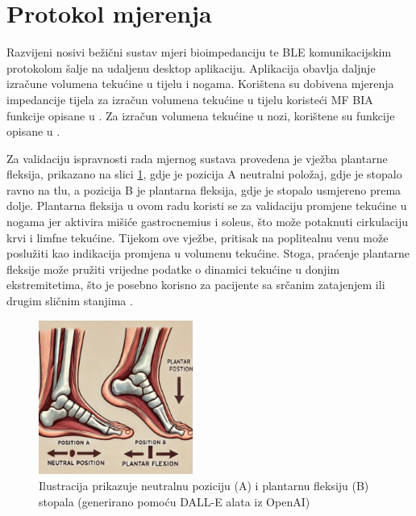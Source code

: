 \documentclass[../diplomski_rad.tex]{subfiles}
\begin{document}
\section{Protokol mjerenja}

Razvijeni nosivi bežični sustav mjeri bioimpedanciju te BLE komunikacijskim protokolom šalje na udaljenu desktop aplikaciju. 
Aplikacija obavlja daljnje izračune volumena tekućine u tijelu i nogama. 
Korištena su dobivena mjerenja impedancije tijela za izračun volumena tekućine u tijelu koristeći MF BIA funkcije opisane u \cite{Sanchez2013}. 
Za izračun volumena tekućine u nozi, korištene su funkcije opisane u \cite{Delano2022}.

Za validaciju ispravnosti rada mjernog sustava provedena je vježba plantarne fleksija, 
prikazano na slici \ref{slk:plantarna_fleksija}, gdje je pozicija A neutralni položaj, 
gdje je stopalo ravno na tlu, a pozicija B je plantarna fleksija, gdje je stopalo usmjereno prema dolje. 
Plantarna fleksija u ovom radu koristi se za validaciju promjene tekućine u nogama jer aktivira 
mišiće gastrocnemius i soleus, što može potaknuti cirkulaciju krvi i limfne tekućine. 
Tijekom ove vježbe, pritisak na poplitealnu venu može poslužiti kao indikacija promjena u volumenu tekućine. 
Stoga, praćenje plantarne fleksije može pružiti vrijedne podatke o dinamici tekućine u donjim ekstremitetima, 
što je posebno korisno za pacijente sa srčanim zatajenjem ili drugim sličnim stanjima \cite{AVILADEOLIVEIRA2022102625}. 

\begin{figure}[htb]
    \centering
    \includegraphics[width=0.45\textwidth]{Figures/plantarna_fleksija.jpg} 
    \caption{Ilustracija prikazuje neutralnu poziciju (A) i plantarnu fleksiju (B) stopala \newline (generirano pomoću DALL-E alata iz OpenAI)
    }
    \label{slk:plantarna_fleksija}
\end{figure}
\end{document}
